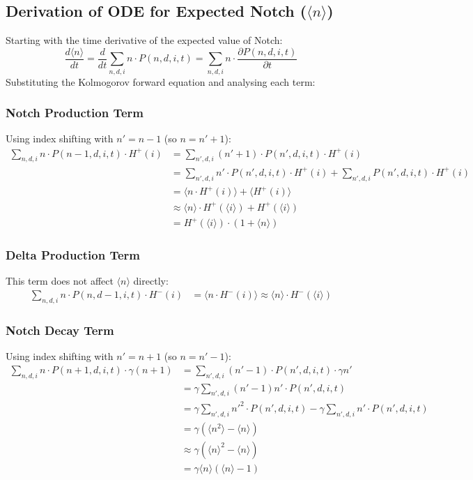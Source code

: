 \documentclass{article}
\begin{document}
\begin{flushleft}
\subsection*{Derivation of ODE for Expected Notch ($\langle n \rangle$)}

Starting with the time derivative of the expected value of Notch:
$$\frac{d\langle n \rangle}{dt} = \frac{d}{dt}\sum_{n,d,i} n \cdot P(n,d,i,t) = \sum_{n,d,i} n \cdot \frac{\partial P(n,d,i,t)}{\partial t}$$
Substituting the Kolmogorov forward equation and analysing each term:

\subsubsection*{Notch Production Term}
Using index shifting with $n' = n-1$ (so $n = n'+1$):
\begin{align*}
\sum_{n,d,i} n \cdot P(n-1,d,i,t) \cdot H^+(i) &= \sum_{n',d,i} (n'+1) \cdot P(n',d,i,t) \cdot H^+(i) \\
&= \sum_{n',d,i} n' \cdot P(n',d,i,t) \cdot H^+(i) + \sum_{n',d,i} P(n',d,i,t) \cdot H^+(i) \\
&= \langle n \cdot H^+(i) \rangle + \langle H^+(i) \rangle \\
&\approx \langle n \rangle \cdot H^+(\langle i \rangle) + H^+(\langle i \rangle) \\
&= H^+(\langle i \rangle) \cdot (1 + \langle n \rangle)
\end{align*}

\subsubsection*{Delta Production Term}
This term does not affect $\langle n \rangle$ directly:
\begin{align*}
\sum_{n,d,i} n \cdot P(n,d-1,i,t) \cdot H^-(i) &= \langle n \cdot H^-(i) \rangle
\approx \langle n \rangle \cdot H^-(\langle i \rangle)
\end{align*}

\subsubsection*{Notch Decay Term}
Using index shifting with $n' = n+1$ (so $n = n'-1$):
\begin{align*}
\sum_{n,d,i} n \cdot P(n+1,d,i,t) \cdot \gamma(n+1) &= \sum_{n',d,i} (n'-1) \cdot P(n',d,i,t) \cdot \gamma n' \\
&= \gamma \sum_{n',d,i} (n'-1)n' \cdot P(n',d,i,t) \\
&= \gamma \sum_{n',d,i} n'^2 \cdot P(n',d,i,t) - \gamma \sum_{n',d,i} n' \cdot P(n',d,i,t) \\
&= \gamma(\langle n^2 \rangle - \langle n \rangle) \\
&\approx \gamma(\langle n \rangle^2 - \langle n \rangle) \\
&= \gamma \langle n \rangle (\langle n \rangle - 1)
\end{align*}


\end{flushleft}
\end{document}
